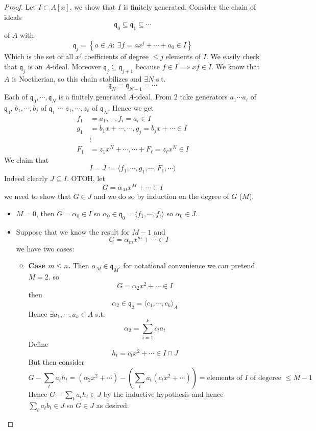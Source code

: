 \documentclass[11pt,a4paper]{article}
\theoremstyle{definition}
\theoremstyle{plain}
\theoremstyle{remark}
\renewcommand{\set}[1]{\left\{ #1 \right\}}
\newcommand{\angles}[1]{\langle #1 \rangle}
\begin{document}
\begin{proof}
    Let $I \subset A[x]$, we show that $I$ is finitely generated. Consider the chain of ideals 
    $$\mathfrak{q}_0 \subseteq \mathfrak{q}_1 \subseteq \cdots$$ 
    of $A$ with 
    $$\mathfrak{q}_j = \set{a \in A \colon \ \exists f = ax^j + \cdots + a_0 \in I}$$
    Which is the set of all $x^j$ coefficients of degree $\le j$ elements of $I$. 
    We easily check that $\mathfrak{q}_j$ is an $A$-ideal. Moreover $\mathfrak{q}_j \subseteq \mathfrak{q}_{j+1}$ 
    because $f\in I \implies xf \in I$. We know that $A$ is Noetherian, so this chain stabilizes and $\exists N$ s.t. 
    $$\mathfrak{q}_{N} = \mathfrak{q}_{N+1} = \cdots$$
    Each of $\mathfrak{q}_0, \cdots, \mathfrak{q}_N$ is a finitely generated $A$-ideal. 
    From $2$ take generators $a_1 \cdots a_i$ of $\mathfrak{q}_0$, $b_1, \cdots, b_j$ of $\mathfrak{q}_1$ $\cdots$ $z_1, \cdots, z_\ell$ of $\mathfrak{q}_N$. 
    Hence we get 
    \begin{align*}
        f_1 &= a_1, \cdots, f_i = a_i \in I \\
        g_1 &= b_1 x + \cdots, \cdots, g_j = b_jx + \cdots \in I \\
        &\vdots \\
        F_1 &= z_1x^N + \cdots, \cdots + F_\ell = z_\ell x^N \in I 
    \end{align*}
    We claim that 
    $$I = J := \angles{f_1, \cdots, g_1, \cdots, F_1, \cdots}$$
    Indeed clearly $J \subseteq I$. OTOH, let 
    $$G = \alpha_M x^M + \cdots \in I$$
    we need to show that $G \in J$ and we do so by induction on the degree of $G$ ($M$). 
    \begin{itemize}
        \item $M = 0$, then $G = \alpha_0 \in I$ so $\alpha_0 \in \mathfrak{q}_0 = \angles{f_1, \cdots, f_i}$ 
        so $\alpha_0 \in J$. 

        \item Suppose that we know the result for $M-1$ and 
        $$G = \alpha_m x^m + \cdots \in I$$
        we have two cases: 
        \begin{itemize}
            \item \textbf{Case $m \le n$.} Then $\alpha_M \in \mathfrak{q}_M$. 
            for notational convenience we can pretend $M = 2$. so 
            $$G = \alpha_2 x^2 + \cdots \in I$$
            then 
            $$\alpha_2 \in \mathfrak{q_2} = \angles{c_1, \cdots, c_k}_A$$
            Hence $\exists a_1, \cdots, a_k \in A$ s.t. 
            $$\alpha_2 = \sum_{i=1}^k c_t a_t$$
            Define 
            $$h_t = c_tx^2 + \cdots \in I \cap J$$
            But then consider 
            $$G - \sum_t a_t h_t = (\alpha_2 x^2 + \cdots) - (\sum_t a_t (c_t x^2 + \cdots)) = \text{elements of $I$ of degeree $\le M-1$}$$
            Hence $G - \sum_t a_t h_t \in J$ by the inductive hypothesis and hence $\sum_t a_t b_t \in J$ so $G \in J$ as desired.
            

\end{itemize}
\end{itemize}
\end{proof}
\end{document}
